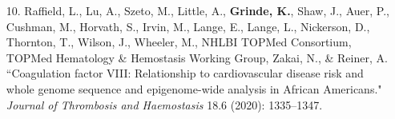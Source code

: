 \documentclass[margin]{res}
\begin{document}
\begin{resume}
\begin{itemize}
\item[10.] Raffield, L., Lu, A., Szeto, M., Little, A., \textbf{Grinde, K.},  Shaw, J., Auer, P., Cushman, M., Horvath, S., Irvin, M., Lange, E., Lange, L., Nickerson, D., Thornton, T., Wilson, J., Wheeler, M., NHLBI TOPMed Consortium, TOPMed Hematology \& Hemostasis Working Group, Zakai, N., \& Reiner, A. ``Coagulation factor VIII: Relationship to cardiovascular disease risk and whole genome sequence and epigenome-wide analysis in African Americans." \textit{Journal of Thrombosis and Haemostasis} 18.6 (2020): 1335--1347.


\end{itemize}
\end{resume}
\end{document}
